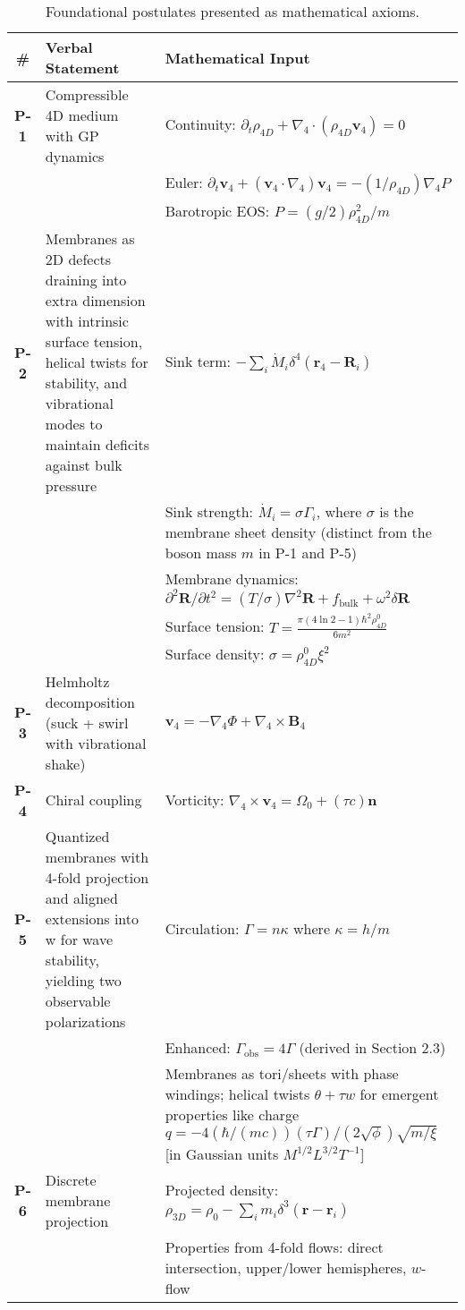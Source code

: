 \begin{table}[H]
\centering
\begin{tabularx}{\textwidth}{|c|Y|Y|}
\hline
\# & Verbal Statement & Mathematical Input \\
\hline
\textbf{P-1} & Compressible 4D medium with GP dynamics & Continuity: $\partial_t \rho_{4D} + \nabla_4 \cdot (\rho_{4D} \mathbf{v}_4) = 0$ \\
& & Euler: $\partial_t \mathbf{v}_4 + (\mathbf{v}_4 \cdot \nabla_4) \mathbf{v}_4 = -(1/\rho_{4D}) \nabla_4 P$ \\
& & Barotropic EOS: $P = (g/2) \rho_{4D}^2 / m$ \\
\hline
\textbf{P-2} & Membranes as 2D defects draining into extra dimension with intrinsic surface tension, helical twists for stability, and vibrational modes to maintain deficits against bulk pressure & Sink term: $-\sum_i \dot{M}_i \delta^4(\mathbf{r}_4 - \mathbf{R}_i)$ \\
& & Sink strength: $\dot{M}_i = \sigma \Gamma_i$, where $\sigma$ is the membrane sheet density (distinct from the boson mass $m$ in P-1 and P-5) \\
& & Membrane dynamics: $\partial^2 \mathbf{R}/\partial t^2 = (T/\sigma) \nabla^2 \mathbf{R} + f_{\text{bulk}} + \omega^2 \delta \mathbf{R}$ \\
& & Surface tension: $T = \frac{\pi (4 \ln 2 - 1) \hbar^2 \rho_{4D}^0}{6 m^2}$ \\
& & Surface density: $\sigma = \rho_{4D}^0 \xi^2$ \\
\hline
\textbf{P-3} & Helmholtz decomposition (suck + swirl with vibrational shake) & $\mathbf{v}_4 = -\nabla_4 \Phi + \nabla_4 \times \mathbf{B}_4$ \\
\hline
\textbf{P-4} & Chiral coupling & Vorticity: $\nabla_4 \times \mathbf{v}_4 = \Omega_0 + (\tau c) \mathbf{n}$ \\
\hline
\textbf{P-5} & Quantized membranes with 4-fold projection and aligned extensions into w for wave stability, yielding two observable polarizations & Circulation: $\Gamma = n \kappa$ where $\kappa = h / m$ \\
& & Enhanced: $\Gamma_{\text{obs}} = 4 \Gamma$ (derived in Section 2.3) \\
& & Membranes as tori/sheets with phase windings; helical twists $\theta + \tau w$ for emergent properties like charge $q = -4 (\hbar / (m c)) (\tau \Gamma) / (2 \sqrt{\phi}) \sqrt{m / \xi}$ [in Gaussian units $M^{1/2} L^{3/2} T^{-1}$] \\
\hline
\textbf{P-6} & Discrete membrane projection & Projected density: $\rho_{3D} = \rho_0 - \sum_i m_i \delta^3(\mathbf{r} - \mathbf{r}_i)$ \\
& & Properties from 4-fold flows: direct intersection, upper/lower hemispheres, $w$-flow \\
\hline
\end{tabularx}
\caption{Foundational postulates presented as mathematical axioms.}
\label{tab:postulates}
\end{table}


